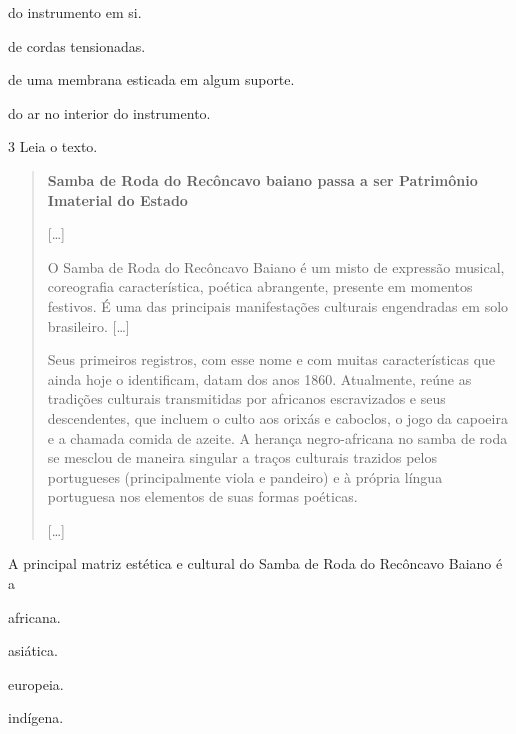 \begin{minipage}{.5\textwidth}
\begin{escolha}
\item
  do instrumento em si.
\item
  de cordas tensionadas.
\item
  de uma membrana esticada em algum suporte.
\item
  do ar no interior do instrumento.
\end{escolha}
\end{minipage}

\pagebreak
\num{3}  Leia o texto.

\begin{quote}
\textbf{Samba de Roda do Recôncavo baiano passa a ser Patrimônio Imaterial do Estado}

{[}\ldots{}{]}

O Samba de Roda do Recôncavo Baiano é um misto de expressão musical,
coreografia característica, poética abrangente, presente em momentos
festivos. É uma das principais manifestações culturais engendradas em
solo brasileiro. {[}\ldots{}{]}

Seus primeiros registros, com esse nome e com muitas características que
ainda hoje o identificam, datam dos anos 1860. Atualmente, reúne as
tradições culturais transmitidas por africanos escravizados e seus
descendentes, que incluem o culto aos orixás e caboclos, o jogo da
capoeira e a chamada comida de azeite. A herança negro-africana no samba
de roda se mesclou de maneira singular a traços culturais trazidos pelos
portugueses (principalmente viola e pandeiro) e à própria língua
portuguesa nos elementos de suas formas poéticas.

{[}\ldots{}{]}

\end{quote}

A principal matriz estética e cultural do Samba de Roda do Recôncavo Baiano é a

\begin{minipage}{.5\textwidth}
\begin{escolha}
\item
  africana.
\item
  asiática.
\item
  europeia.
\item
  indígena.
\end{escolha}
\end{minipage}

